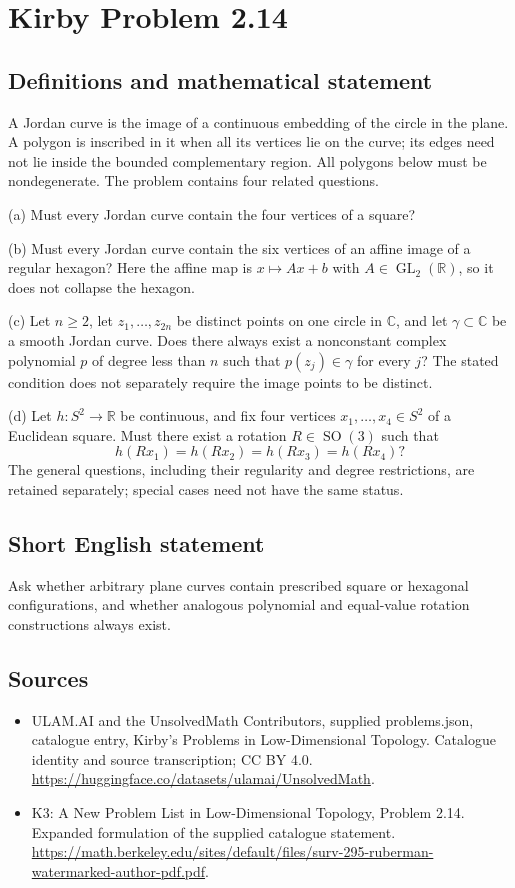 \documentclass[11pt,a4paper]{article}
\begin{document}
\section*{Kirby Problem 2.14}\label{statement}

\subsection{Definitions and mathematical statement}
A Jordan curve is the image of a continuous embedding of the circle in the
plane. A polygon is inscribed in it when all its vertices lie on the curve;
its edges need not lie inside the bounded complementary region. All polygons
below must be nondegenerate. The problem contains four related questions.

(a) Must every Jordan curve contain the four vertices of a square?

(b) Must every Jordan curve contain the six vertices of an affine image of a
regular hexagon? Here the affine map is $x\mapsto Ax+b$ with
$A\in\operatorname{GL}_2(\mathbb R)$, so it does not collapse the hexagon.

(c) Let $n\geq2$, let $z_1,\ldots,z_{2n}$ be distinct points on one circle in
$\mathbb C$, and let $\gamma\subset\mathbb C$ be a smooth Jordan curve.
Does there always exist a nonconstant complex polynomial $p$ of degree less
than $n$ such that $p(z_j)\in\gamma$ for every $j$? The stated condition does
not separately require the image points to be distinct.

(d) Let $h:S^2\to\mathbb R$ be continuous, and fix four vertices
$x_1,\ldots,x_4\in S^2$ of a Euclidean square. Must there exist a rotation
$R\in\operatorname{SO}(3)$ such that
\[
 h(Rx_1)=h(Rx_2)=h(Rx_3)=h(Rx_4)?
\]
The general questions, including their regularity and degree restrictions,
are retained separately; special cases need not have the same status.
\subsection{Short English statement}
Ask whether arbitrary plane curves contain prescribed square or hexagonal configurations, and whether analogous polynomial and equal-value rotation constructions always exist.
\subsection{Sources}
\begin{itemize}
\item[S1] ULAM.AI and the UnsolvedMath Contributors, supplied problems.json, catalogue entry, Kirby's Problems in Low-Dimensional Topology. Catalogue identity and source transcription; CC BY 4.0.
\url{https://huggingface.co/datasets/ulamai/UnsolvedMath}.
\item[S2] K3: A New Problem List in Low-Dimensional Topology, Problem 2.14. Expanded formulation of the supplied catalogue statement.
\url{https://math.berkeley.edu/sites/default/files/surv-295-ruberman-watermarked-author-pdf.pdf}.
\end{itemize}
\end{document}

